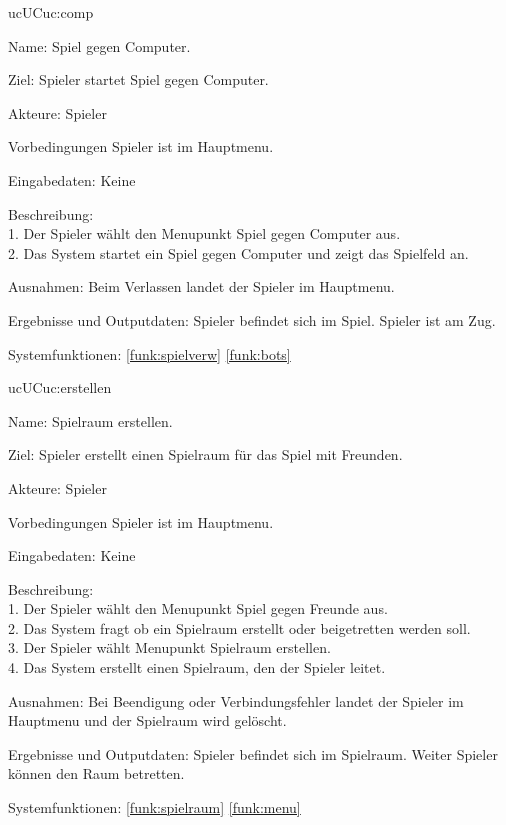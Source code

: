 \begin{description}[leftmargin=5em, style=sameline]
	\begin{lhp}{uc}{UC}{uc:comp}
		\item [Name:] Spiel gegen Computer.
		\item [Ziel:] Spieler startet Spiel gegen Computer.
		\item [Akteure:] Spieler
		\item [Vorbedingungen] Spieler ist im Hauptmenu.
		\item [Eingabedaten:] Keine
		\item [Beschreibung:] \hfill\\
				1. Der Spieler wählt den Menupunkt Spiel gegen Computer aus.\\
				2. Das System startet ein Spiel gegen Computer und zeigt das Spielfeld an.
		\item [Ausnahmen:] Beim Verlassen landet der Spieler im Hauptmenu.
		\item [Ergebnisse und Outputdaten:] Spieler befindet sich im Spiel. Spieler ist am Zug.
		\item [Systemfunktionen:] \ref{funk:spielverw} \ref{funk:bots}
	\end{lhp}

	\begin{lhp}{uc}{UC}{uc:erstellen}
		\item [Name:] Spielraum erstellen.
		\item [Ziel:] Spieler erstellt einen Spielraum für das Spiel mit Freunden.
		\item [Akteure:] Spieler
		\item [Vorbedingungen] Spieler ist im Hauptmenu.
		\item [Eingabedaten:] Keine
		\item [Beschreibung:] \hfill\\
				1. Der Spieler wählt den Menupunkt Spiel gegen Freunde aus.\\
				2. Das System fragt ob ein Spielraum erstellt oder beigetretten werden soll.\\
				3. Der Spieler wählt Menupunkt Spielraum erstellen.\\
				4. Das System erstellt einen Spielraum, den der Spieler leitet.
		\item [Ausnahmen:] Bei Beendigung oder Verbindungsfehler landet der Spieler im Hauptmenu und der Spielraum wird gelöscht.
		\item [Ergebnisse und Outputdaten:] Spieler befindet sich im Spielraum. Weiter Spieler können den Raum betretten.
		\item [Systemfunktionen:] \ref{funk:spielraum} \ref{funk:menu}
	\end{lhp}


\end{description}
